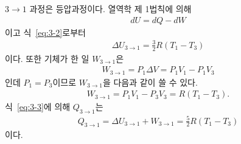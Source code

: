 \documentclass[floatfix,nofootinbib,superscriptaddress,fleqn]{revtex4}
\begin{document}
$3\to 1$ 과정은 등압과정이다. 열역학 제 1법칙에 의해
\begin{align}\label{eq:3-3}
  dU = dQ -dW
\end{align}
 이고 식~\eqref{eq:3-2}로부터
\begin{align}\label{eq:3-4}
  \Delta U_{3\to 1} = \frac{3}{2}R(T_1-T_3)
\end{align}
이다. 또한 기체가 한 일 $W_{3\to 1}$은
\begin{align}
  W_{3\to 1} = P_1\Delta V = P_1V_1-P_1V_3
\end{align}
인데 $P_1=P_3$이므로 $W_{3\to 1}$을 다음과 같이 쓸 수 있다.
\begin{align}\label{eq:3-5}
  W_{3\to 1} = P_1V_1-P_3V_3 = R(T_1-T_3).
\end{align}
식~\eqref{eq:3-3}에 의해 $Q_{3\to 1}$는
\begin{align}\label{eq:3-6}
  Q_{3\to 1} = \Delta U_{3\to 1} + W_{3\to 1}
  = \frac{5}{2}R(T_1-T_3)
\end{align}
이다.
\end{document}
